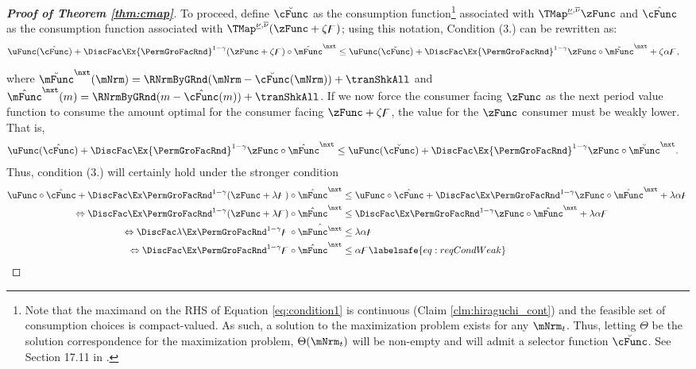 \documentclass[\econtexRoot/BufferStockTheory]{subfiles}
\begin{document}
\begin{proof}[\textbf{Proof of Theorem \ref{thm:cmap}}]
To proceed, define
$\breve{\cFunc}$ as the consumption 
function\footnote{Note that the maximand on the RHS of Equation \eqref{eq:condition1} is continuous (Claim \ref{clm:hiraguchi_cont}) and the feasible set of consumption choices is compact-valued.
As such, a solution to the maximization problem exists for any $\mNrm_{t}$.
Thus, letting $\Theta$ be the solution correspondence for the maximization problem, $\Theta(\mNrm_{t})$ will be non-empty and will admit a selector function $\breve{\cFunc}$.
See Section 17.11 in \cite{Aliprantis2005}.}
associated with $\TMap^{\MPCminInf, \MPCmaxInf}{\zFunc}$ and $\hat{\cFunc}$ as the consumption function associated with $\TMap^{\MPCminInf, \MPCmaxInf}({\zFunc+\zeta
  \boundFunc})$; using this notation, Condition (3.) can be rewritten as:
\begin{align*}
  \uFunc(\hat{\cFunc})+\DiscFac \Ex {\PermGroFacRnd}^{1-\CRRA }(\zFunc+\zeta \boundFunc)\circ \hat{\mFunc}^{\nxt}  & \leq  \uFunc(\breve{\cFunc})+\DiscFac\Ex {\PermGroFacRnd}^{1-\CRRA }\zFunc\circ\breve{\mFunc}^{\nxt}  + \zeta \Shrinker \boundFunc,
\end{align*}

where $\breve{\mFunc}^{\nxt}(\mNrm) = \RNrmByGRnd(\mNrm - \breve{\cFunc}(\mNrm)) +\tranShkAll$ and $\hat{\mFunc}^{\nxt}(m) = \RNrmByGRnd(m - \hat{\cFunc}(m))+\tranShkAll$.
If we now force the consumer facing $\zFunc$ as the next period value function to consume the amount optimal for the consumer facing $\zFunc+\zeta \boundFunc$, the value for the $\zFunc$ consumer must be weakly lower.
That is,
%
\begin{align*}
  \uFunc(\hat{\cFunc})+\DiscFac \Ex{\PermGroFacRnd}^{1-\CRRA } \zFunc \circ \hat{\mFunc}^{\nxt}  & \leq \uFunc(\breve{\cFunc})+\DiscFac \Ex {\PermGroFacRnd}^{1-\CRRA }\zFunc\circ\breve{\mFunc}^{\nxt}.                                 
\end{align*}
%
Thus, condition (3.) will certainly hold under the stronger condition
\begin{equation}\begin{gathered}\begin{aligned}
  \uFunc\circ \hat{\cFunc} +\DiscFac \Ex\PermGroFacRnd^{1-\CRRA } (\zFunc+\lambda \boundFunc) \circ \hat{\mFunc}^{\nxt}  & \leq  \uFunc\circ \hat{\cFunc} + \DiscFac \Ex\PermGroFacRnd^{1-\CRRA } \zFunc\circ\hat{\mFunc}^{\nxt}  + \lambda \Shrinker \boundFunc \notag
  \\ \Leftrightarrow \DiscFac\Ex\PermGroFacRnd^{1-\CRRA }(\zFunc +\lambda \boundFunc) \circ\hat{\mFunc}^{\nxt}  & \leq  \DiscFac \Ex\PermGroFacRnd^{1-\CRRA }\zFunc\circ \hat{\mFunc}^{\nxt}  + \lambda \Shrinker \boundFunc \notag
  \\ \Leftrightarrow  \DiscFac\lambda \Ex\PermGroFacRnd^{1-\CRRA }\boundFunc\circ\hat{\mFunc^{\nxt}}  & \leq  \lambda \Shrinker \boundFunc \notag
  \\ \Leftrightarrow  \DiscFac \Ex\PermGroFacRnd^{1-\CRRA }\boundFunc \circ \hat{\mFunc}^{\nxt}  & \leq  \Shrinker \boundFunc \labelsafe{eq:reqCondWeak}     
\end{aligned}\end{gathered}\end{equation}


\end{proof}
\end{document}
